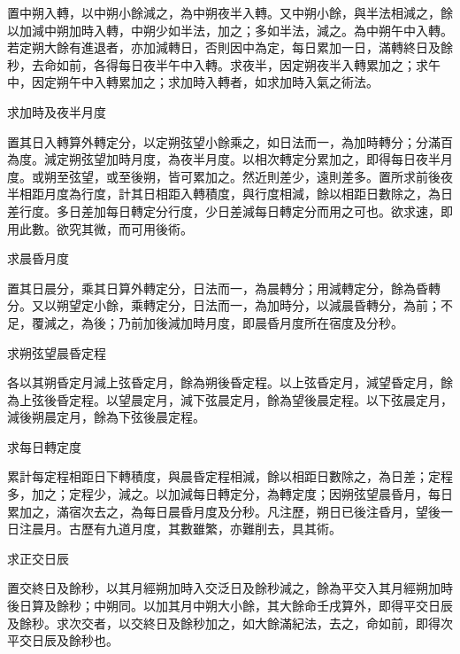\begin{pinyinscope}
 置中朔入轉，以中朔小餘減之，為中朔夜半入轉。又中朔小餘，與半法相減之，餘以加減中朔加時入轉，中朔少如半法，加之；多如半法，減之。為中朔午中入轉。若定朔大餘有進退者，亦加減轉日，否則因中為定，每日累加一日，滿轉終日及餘秒，去命如前，各得每日夜半午中入轉。求夜半，因定朔夜半入轉累加之；求午中，因定朔午中入轉累加之；求加時入轉者，如求加時入氣之術法。



 求加時及夜半月度



 置其日入轉算外轉定分，以定朔弦望小餘乘之，如日法而一，為加時轉分；分滿百為度。減定朔弦望加時月度，為夜半月度。以相次轉定分累加之，即得每日夜半月度。或朔至弦望，或至後朔，皆可累加之。然近則差少，遠則差多。置所求前後夜半相距月度為行度，計其日相距入轉積度，與行度相減，餘以相距日數除之，為日差行度。多日差加每日轉定分行度，少日差減每日轉定分而用之可也。欲求速，即用此數。欲究其微，而可用後術。



 求晨昏月度



 置其日晨分，乘其日算外轉定分，日法而一，為晨轉分；用減轉定分，餘為昏轉分。又以朔望定小餘，乘轉定分，日法而一，為加時分，以減晨昏轉分，為前；不足，覆減之，為後；乃前加後減加時月度，即晨昏月度所在宿度及分秒。



 求朔弦望晨昏定程



 各以其朔昏定月減上弦昏定月，餘為朔後昏定程。以上弦昏定月，減望昏定月，餘為上弦後昏定程。以望晨定月，減下弦晨定月，餘為望後晨定程。以下弦晨定月，減後朔晨定月，餘為下弦後晨定程。



 求每日轉定度



 累計每定程相距日下轉積度，與晨昏定程相減，餘以相距日數除之，為日差；定程多，加之；定程少，減之。以加減每日轉定分，為轉定度；因朔弦望晨昏月，每日累加之，滿宿次去之，為每日晨昏月度及分秒。凡注歷，朔日已後注昏月，望後一日注晨月。古歷有九道月度，其數雖繁，亦難削去，具其術。



 求正交日辰



 置交終日及餘秒，以其月經朔加時入交泛日及餘秒減之，餘為平交入其月經朔加時後日算及餘秒；中朔同。以加其月中朔大小餘，其大餘命壬戌算外，即得平交日辰及餘秒。求次交者，以交終日及餘秒加之，如大餘滿紀法，去之，命如前，即得次平交日辰及餘秒也。




\end{pinyinscope}
